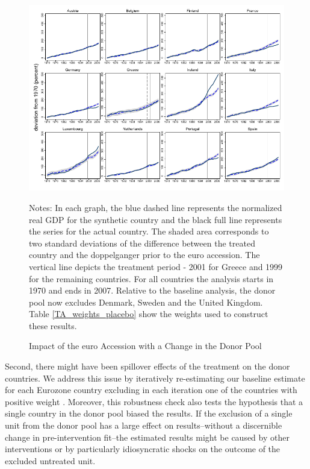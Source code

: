 \documentclass[12pt]{article}
\newcommand{\annote}[1]{\parbox{\textwidth}{\renewcommand{\baselinestretch}{1.0}\vspace{12pt} \small Notes: #1}}
\begin{document}
\begin{figure}[h!]
    \centering
    \caption{Impact of the euro Accession with a Change in the Donor Pool \label{F_donor}}
    \includegraphics[scale=1.2]{Output/Figures/SCM_gdp_Rob_1999_Annual_DNK_SWE_GBR.pdf}
    \annote{In each graph, the blue dashed line represents the normalized real GDP for the synthetic country and the black full line represents the series for the actual country. The shaded area corresponds to two standard deviations of the difference between the treated country and the doppelganger prior to the euro accession. The vertical line depicts the treatment period - 2001 for Greece and 1999 for the remaining countries. For all countries the analysis starts in 1970 and ends in 2007. Relative to the baseline analysis, the donor pool now excludes Denmark, Sweden and the United Kingdom. Table \ref{TA_weights_placebo} show the weights used to construct these results.}
\end{figure}

Second, there might have been spillover effects of the treatment on the donor countries. We address this issue by iteratively re-estimating our baseline estimate for each Eurozone country excluding in each iteration one of the countries with positive weight \citep{Abadie2015}. Moreover, this robustness check also tests the hypothesis that a single country in the donor pool biased the results. If the exclusion of a single unit from the donor pool has a large effect on results--without a discernible change in pre-intervention fit--the estimated results might be caused by other interventions or by particularly idiosyncratic shocks on the outcome of the excluded untreated unit.
\end{document}
